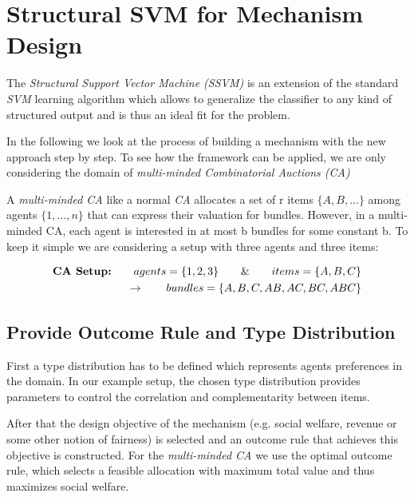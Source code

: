\documentclass[]{article}
\begin{document}
\newpage
\section{Structural SVM for Mechanism Design}
The \emph{Structural Support Vector Machine (SSVM)} is an extension of the standard \emph{SVM} learning algorithm which allows to generalize the classifier to any kind of structured output and is thus an ideal fit for the problem.

\noindent In the following we look at the process of building a mechanism with the new approach step by step.
To see how the framework can be applied, we are only considering the domain of \emph{multi-minded Combinatorial Auctions (CA)}

\noindent A \emph{multi-minded CA} like a normal \emph{CA} allocates a set of r items $\{A, B, ...\}$ among agents  $\{1,..., n\}$ that can express their valuation for bundles. However, in a multi-minded CA, each agent is interested in at most b bundles for some constant b. To keep it simple we are considering a setup with three agents and three items:

\begin{equation*}
\begin{split}
\text{\textbf{CA Setup:}} \qquad agents = \{1, 2, 3\} \qquad \& \qquad items = \{A, B, C\} \\ \qquad \rightarrow \qquad bundles = \{A, B, C, AB, AC, BC, ABC\}
\end{split}
\end{equation*}



\subsection{Provide Outcome Rule and Type Distribution}

First a type distribution has to be defined which represents agents preferences in the domain.
In our example setup, the chosen type distribution provides parameters to control the correlation and complementarity between items.


\noindent After that the design objective of the mechanism (e.g. social welfare, revenue or some other notion of fairness)  is selected and an outcome rule that achieves this objective is constructed. For the \emph{multi-minded CA} we use the optimal outcome rule, which selects a feasible allocation with maximum total value and thus maximizes social welfare.

\newpage
\end{document}

